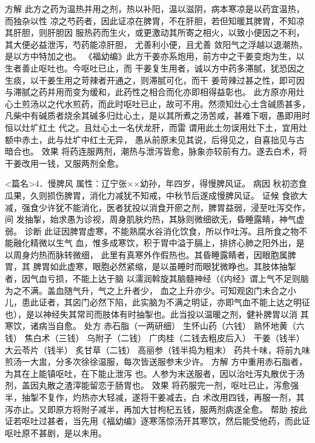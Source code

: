 \documentclass[a4paper,12pt,UTF8,twoside]{ctexbook}
\begin{document}
方解 此方之药为温热并用之剂，热以补阳，温以滋阴，病本寒凉是以药宜温热，而独杂以性 
凉之芍药者，因此证凉在脾胃，不在肝胆，若但知暖其脾胃，不知凉其肝胆，则肝胆因 
服热药而生火，或更激动其所寄之相火，以致小便因之不利，其大便必益泄泻，芍药能凉肝胆， 
尤善利小便，且尤善 
敛阳气之浮越以退潮热，是以方中特加之也。 
《福幼编》此方干姜亦系炮用，前方中之干姜变炮为生，以生者善止呕吐也。今呕吐已止，而 
干姜复生用者，诚以方中药多滞腻，犹恐因之生痰，以干姜生用之苛辣者开通之，则滞腻可化，而干 
姜苛辣过甚之性，即可因与滞腻之药并用而变为缓和，此药性之相合而化亦即相得益彰也。 
此方原亦用灶心土煎汤以之代水煎药，而此时呕吐已止，故可不用。然须知灶心土含碱质甚多， 
凡柴中有碱质者烧余其碱多归灶心土，是以其所煮之汤苦咸，甚难下咽，愚即用时恒以灶圹红土 
代之。且灶心土一名伏龙肝，而雷 谓用此土勿误用灶下土，宜用灶额中赤土，此与灶圹中红土无异， 
愚从前原未见其说，后得见之，自喜拙见与古暗合也。 
效果 将药连服两剂，潮热与泄泻皆愈，脉象亦较前有力。遂去白术，将干姜改用一钱，又服两剂全愈。 

<篇名>4．慢脾风
属性：辽宁张××幼孙，年四岁，得慢脾风证。 
病因 秋初恣食瓜果，久则损伤脾胃，消化力减犹不知戒，中秋节后遂成慢脾风证。 
证候 食欲大减，强食少许犹不能消化，医者犹投以消食开瘀之剂，脾胃益弱，浸至吐泻交作，间 
发抽掣，始求愚为诊视，周身肌肤灼热，其脉则微细欲无，昏睡露睛，神气虚弱。 
诊断 此证因脾胃虚寒，不能熟腐水谷消化饮食，所以作吐泻。且所食之物不能融化精微以生气 
血，惟多成寒饮，积于胃中溢于膈上，排挤心肺之阳外出，是以周身灼热而脉转微细， 
此里有真寒外作假热也。其昏睡露睛者，因眼胞属脾胃，其 
脾胃如此虚寒，眼胞必然紧缩，是以虽睡时而眼犹微睁也。其肢体抽掣者，因气血亏损，不能上达于脑 
以濡润斡旋其脑髓神经（《内经》谓上气不足则脑为之不满。盖血随气升，气之上升者少， 
血之上升亦少。可知观囟门未合之小儿，患此证者，其囟门必然下陷，此实脑为不满之明证，亦即气血不能上达之明征 
也），是以神经失其常司而肢体有时抽掣也。此当投以温暖之剂，健补脾胃以消 
其寒饮，诸病当自愈。 
处方 赤石脂（一两研细） 生怀山药（六钱） 熟怀地黄（六钱） 焦白术（三钱） 
乌附子（二钱） 广肉桂（二钱去粗皮后入） 干姜（钱半） 大云苓片（钱半） 
炙甘草（二钱） 高丽参（钱半捣为粗末） 
药共十味，将前九味煎汤一大盅，分多次徐徐温服，每次皆送服参末少许。 
方解 方中重用赤石脂者，为其在上能镇呕吐，在下能止泄泻 
也。人参为末送服者，因以治吐泻丸散优于汤剂，盖因丸散之渣滓能留恋于肠胃也。 
效果 将药服完一剂，呕吐已止，泻愈强半，抽掣不复作，灼热亦大轻减，遂将干姜减去，白 
术改用四钱，再服一剂，其泻亦止。又即原方将附子减半，再加大甘枸杞五钱，服两剂病遂全愈。 
帮助 按此证若呕吐过甚者，当先用《福幼编》逐寒荡惊汤开其寒饮，然后能受他药，而此证 
呕吐原不甚剧，是以未用。 
\end{document}
